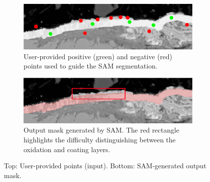 \begin{figure}[H]
    \centering
    \begin{subfigure}[b]{0.7\linewidth}
        \centering
        \includegraphics[width=\linewidth]{PICTURES/SAM/points_sam_small.png}
        \caption{User-provided positive (green) and negative (red) points used to guide the SAM segmentation.}
        \label{fig:input_points}
    \end{subfigure}
    \vspace{0.5cm} %
    \begin{subfigure}[b]{0.7\linewidth}
        \centering
        \includegraphics[width=\linewidth]{PICTURES/SAM/rect_small.png}
        \caption{Output mask generated by SAM. The red rectangle highlights the difficulty distinguishing between the oxidation and coating layers.}
        \label{fig:output_mask}
    \end{subfigure}
    \caption{Top: User-provided points (input). Bottom: SAM-generated output mask.}
    \label{fig:sam_subfigures}
\end{figure}
